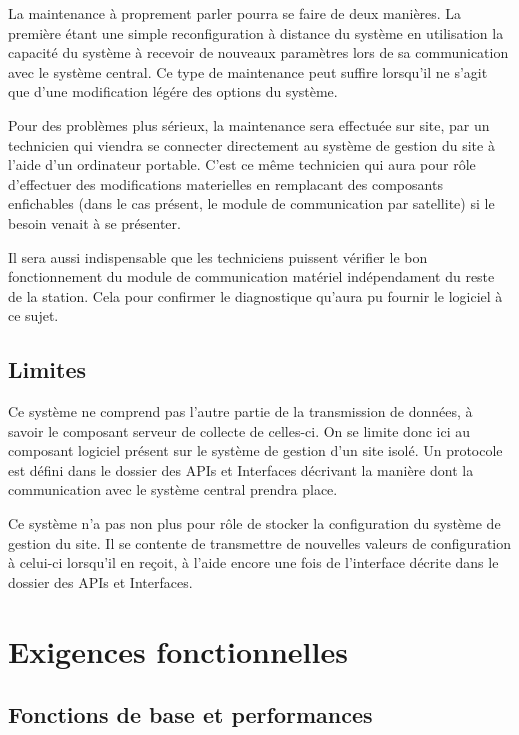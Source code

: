 
La maintenance à proprement parler pourra se faire de deux manières. La première étant une simple reconfiguration à distance du système en utilisation la capacité du système à recevoir de nouveaux paramètres lors de sa communication avec le système central. Ce type de maintenance peut suffire lorsqu'il ne s'agit que d'une modification légére des options du système.

Pour des problèmes plus sérieux, la maintenance sera effectuée sur site, par un technicien qui viendra se connecter directement au système de gestion du site à l'aide d'un ordinateur portable. C'est ce même technicien qui aura pour rôle d'effectuer des modifications materielles en remplacant des composants enfichables (dans le cas présent, le module de communication par satellite) si le besoin venait à se présenter.

Il sera aussi indispensable que les techniciens puissent vérifier le bon fonctionnement du module de communication matériel indépendament du reste de la station. Cela pour confirmer le diagnostique qu'aura pu fournir le logiciel à ce sujet.

\subsection{Limites}

Ce système ne comprend pas l'autre partie de la transmission de données, à savoir le composant serveur de collecte de celles-ci. On se limite donc ici au composant logiciel présent sur le système de gestion d'un site isolé. Un protocole est défini dans le dossier des APIs et Interfaces décrivant la manière dont la communication avec le système central prendra place.

Ce système n'a pas non plus pour rôle de stocker la configuration du système de gestion du site. Il se contente de transmettre de nouvelles valeurs de configuration à celui-ci lorsqu'il en reçoit, à l'aide encore une fois de l'interface décrite dans le dossier des APIs et Interfaces.

\section{Exigences fonctionnelles}

\subsection{Fonctions de base et performances}

